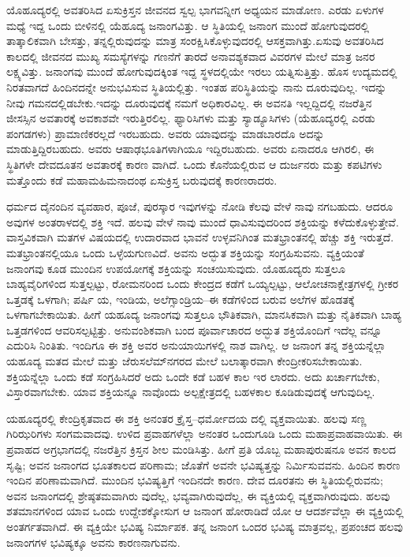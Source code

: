ಯೊಹೂದ್ಯರಲ್ಲಿ ಅವತರಿಸಿದ ಏಸುಕ್ರಿಸ್ತನ ಜೀವನದ ಸ್ವಲ್ಪ ಭಾಗವನ್ನೀಗ ಅಧ್ಯಯನ ಮಾಡೋಣ. ಎರಡು ಏಳುಗಳ ಮಧ್ಯೆ ಇದ್ದ ಒಂದು ಬೀಳಿನಲ್ಲಿ ಯೆಹೂದ್ಯ ಜನಾಂಗವಿತ್ತು. ಆ ಸ್ಥಿತಿಯಲ್ಲಿ ಜನಾಂಗ ಮುಂದೆ ಹೋಗುವುದರಲ್ಲಿ ತಾತ್ಕಾಲಿಕವಾಗಿ ಬೇಸತ್ತು, ತನ್ನಲ್ಲಿರುವುದನ್ನು ಮಾತ್ರ ಸಂರಕ್ಷಿಸಿಕೊಳ್ಳುವುದರಲ್ಲಿ ಆಸಕ್ತವಾಗಿತ್ತು.ಏಸುವು ಅವತರಿಸಿದ ಕಾಲದಲ್ಲಿ ಜೀವನದ ಮುಖ್ಯ ಸಮಸ್ಯೆಗಳನ್ನು ಗಣನೆಗೆ ತಾರದೆ ಅನಾವಶ್ಯಕವಾದ ವಿವರಗಳ ಮೇಲೆ ಮಾತ್ರ ಜನರ ಲಕ್ಷ್ಯವಿತ್ತು. ಜನಾಂಗವು ಮುಂದೆ ಹೋಗುವುದಕ್ಕಿಂತ ಇದ್ದ ಸ್ಥಳದಲ್ಲಿಯೇ ಇರಲು ಯತ್ನಿಸುತ್ತಿತ್ತು. ಹೊಸ ಉದ್ಯಮದಲ್ಲಿ ನಿರತವಾಗದೆ ಹಿಂದಿನದನ್ನೇ ಅನುಭವಿಸುವ ಸ್ಥಿತಿಯಲ್ಲಿತ್ತು. ಇಂತಹ ಪರಿಸ್ಥಿತಿಯನ್ನು ನಾನು ದೂರುವುದಿಲ್ಲ. ಇದನ್ನು ನೀವು ಗಮನದಲ್ಲಿಡಬೇಕು.ಇದನ್ನು ದೂರುವುದಕ್ಕೆ ನಮಗೆ ಅಧಿಕಾರವಿಲ್ಲ. ಈ ಅವನತಿ ಇಲ್ಲದ್ದಿದಲ್ಲಿ ನಜರೆತ್ತಿನ ಜೀಸಸ್ಸಿನ ಅವತಾರಕ್ಕೆ ಅವಕಾಶವೇ ಇರುತ್ತಿರಲಿಲ್ಲ. ಫ್ಯಾರಿಸಿಗಳು ಮತ್ತು ಸ್ಯಾಡ್ಯೂಸಿಗಳು (ಯೆಹೂದ್ಯರಲ್ಲಿ ಎರಡು ಪಂಗಡಗಳು) ಪ್ರಾಮಾಣಿಕರಲ್ಲದೆ ಇರಬಹುದು. ಅವರು ಯಾವುದನ್ನು ಮಾಡಬಾರದೊ ಅದನ್ನು ಮಾಡುತ್ತಿದ್ದಿರಬಹುದು. ಅವರು ಆಷಾಢಭೂತಿಗಳಾಗಿಯೂ ಇದ್ದಿರಬಹುದು. ಅವರು ಏನಾದರೂ ಆಗಿರಲಿ, ಈ ಸ್ಥಿತಿಗಳೇ ದೇವದೂತನ ಅವತಾರಕ್ಕೆ ಕಾರಣ ವಾಗಿದೆ. ಒಂದು ಕೊನೆಯಲ್ಲಿರುವ ಆ ದುರ್ಜನರು ಮತ್ತು ಕಪಟಿಗಳು ಮತ್ತೊಂದು ಕಡೆ ಮಹಾಮಹಿಮನಾದಂಥ ಏಸುಕ್ರಿಸ್ತ ಬರುವುದಕ್ಕೆ ಕಾರಣರಾದರು.

ಧರ್ಮದ ದೈನಂದಿನ ವ್ಯವಹಾರ, ಪೂಜೆ, ಪುರಸ್ಕಾರ ಇವುಗಳನ್ನು ನೋಡಿ ಕೆಲವು ವೇಳೆ ನಾವು ನಗಬಹುದು. ಆದರೂ ಅವುಗಳ ಅಂತರಾಳದಲ್ಲಿ ಶಕ್ತಿ ಇದೆ. ಹಲವು ವೇಳೆ ನಾವು ಮುಂದೆ ಧಾವಿಸುವುದರಿಂದ ಶಕ್ತಿಯನ್ನು ಕಳೆದುಕೊಳ್ಳುತ್ತೇವೆ. ವಾಸ್ತವಿಕವಾಗಿ ಮತಗಳ ವಿಷಯದಲ್ಲಿ ಉದಾರವಾದ ಭಾವನೆ ಉಳ್ಳವನಿಗಿಂತ ಮತಭ್ರಾಂತನಲ್ಲಿ ಹೆಚ್ಚು ಶಕ್ತಿ ಇರುತ್ತದೆ. ಮತಭ್ರಾಂತನಲ್ಲಿಯೂ ಒಂದು ಒಳ್ಳೆಯಗುಣವಿದೆ. ಅವನು ಅದ್ಭುತ ಶಕ್ತಿಯನ್ನು ಸಂಗ್ರಹಿಸುವನು. ವ್ಯಕ್ತಿಯಂತೆ ಜನಾಂಗವು ಕೂಡ ಮುಂದಿನ ಉಪಯೋಗಕ್ಕೆ ಶಕ್ತಿಯನ್ನು ಸಂಚಯಿಸುವುದು. ಯೊಹೂದ್ಯರು ಸುತ್ತಲೂ ಬಾಹ್ಯವೈರಿಗಳಿಂದ ಸುತ್ತಲ್ಪಟ್ಟು, ರೋಮನರಿಂದ ಒಂದು ಕೇಂದ್ರದ ಕಡೆಗೆ ಒಯ್ಯಲ್ಪಟ್ಟು, ಆಲೋಚನಾಕ್ಷೇತ್ರಗಳಲ್ಲಿ ಗ್ರೀಕರ ಒತ್ತಡಕ್ಕೆ ಒಳಗಾಗಿ; ಪರ್ಷಿ ಯ, ಇಂಡಿಯ, ಅಲೆಗ್ಸಾಂಡ್ರಿಯ–ಈ ಕಡೆಗಳಿಂದ ಬರುವ ಅಲೆಗಳ ಹೊಡತಕ್ಕೆ ಒಳಗಾಗಬೇಕಾಯಿತು. ಹೀಗೆ ಯಹೂದ್ಯ ಜನಾಂಗವು ಸುತ್ತಲೂ ಭೌತಿಕವಾಗಿ, ಮಾನಸಿಕವಾಗಿ ಮತ್ತು ನೈತಿಕವಾಗಿ ಬಾಹ್ಯ ಒತ್ತಡಗಳಿಂದ ಆವರಿಸಲ್ಪಟ್ಟಿತ್ತು. ಅನುವಂಶಿಕವಾಗಿ ಬಂದ ಪೂರ್ವಾಚಾರದ ಅದ್ಭುತ ಶಕ್ತಿಯೊಂದಿಗೆ ಇದೆಲ್ಲ ವನ್ನೂ ಎದುರಿಸಿ ನಿಂತಿತು. ಇಂದಿಗೂ ಈ ಶಕ್ತಿ ಅವರ ಅನುಯಾಯಿಗಳಲ್ಲಿ ನಾಶ ವಾಗಿಲ್ಲ. ಆ ಜನಾಂಗ ತನ್ನ ಶಕ್ತಿಯನ್ನೆಲ್ಲಾ ಯಹೂದ್ಯ ಮತದ ಮೇಲೆ ಮತ್ತು ಜೆರುಸಲೆಮ್​ನಗರದ ಮೇಲೆ ಬಲಾತ್ಕಾರವಾಗಿ ಕೇಂದ್ರೀಕರಿಸಬೇಕಾಯಿತು. ಶಕ್ತಿಯನ್ನೆಲ್ಲಾ ಒಂದು ಕಡೆ ಸಂಗ್ರಹಿಸಿದರೆ ಅದು ಒಂದೇ ಕಡೆ ಬಹಳ ಕಾಲ ಇರ ಲಾರದು. ಅದು ಖರ್ಚಾಗಬೇಕು, ವಿಸ್ತಾರವಾಗಬೇಕು. ಯಾವ ಶಕ್ತಿಯನ್ನೂ ನಾವೊಂದು ಅಲ್ಪಕ್ಷೇತ್ರದಲ್ಲಿ ಬಹಳಕಾಲ ಕೂಡಿಡುವುದಕ್ಕೆ ಆಗುವುದಿಲ್ಲ.

ಯಹೂದ್ಯರಲ್ಲಿ ಕೇಂದ್ರಿಕೃತವಾದ ಈ ಶಕ್ತಿ ಅನಂತರ ಕ್ರೈಸ್ತ–ಧರ್ಮೋದಯ ದಲ್ಲಿ ವ್ಯಕ್ತವಾಯಿತು. ಹಲವು ಸಣ್ಣ ಗಿರಿಝರಿಗಳು ಸಂಗಮವಾದವು. ಉಳಿದ ಪ್ರವಾಹಗಳೆಲ್ಲಾ ಅನಂತರ ಒಂದುಗೂಡಿ ಒಂದು ಮಹಾಪ್ರವಾಹವಾಯಿತು. ಈ ಪ್ರವಾಹದ ಅಗ್ರಭಾಗದಲ್ಲಿ ನಜರೆತ್ತಿನ ಕ್ರಿಸ್ತನ ಶೀಲ ಮಂಡಿಸಿತ್ತು. ಹೀಗೆ ಪ್ರತಿ ಯೊಬ್ಬ ಮಹಾಪುರುಷನೂ ಅವನ ಕಾಲದ ಸೃಷ್ಟಿ; ಅವನ ಜನಾಂಗದ ಭೂತಕಾಲದ ಪರಿಣಾಮ; ಜೊತೆಗೆ ಅವನೇ ಭವಿಷ್ಯತ್ತನ್ನು ನಿರ್ಮಿಸುವವನು. ಹಿಂದಿನ ಕಾರಣ ಇಂದಿನ ಪರಿಣಾಮವಾಗಿದೆ. ಮುಂದಿನ ಭವಿಷ್ಯತ್ತಿಗೆ ಇಂದಿನದೇ ಕಾರಣ. ದೇವ ದೂರತನು ಈ ಸ್ಥಿತಿಯಲ್ಲಿರುವನು; ಅವನ ಜನಾಂಗದಲ್ಲಿ ಶ್ರೇಷ್ಠತಮವಾಗಿರು ವುದೆಲ್ಲ, ಭವ್ಯವಾಗಿರುವುದೆಲ್ಲ, ಈ ವ್ಯಕ್ತಿಯಲ್ಲಿ ವ್ಯಕ್ತವಾಗಿರುವುದು. ಹಲವು ಶತಮಾನಗಳಿಂದ ಯಾವ ಒಂದು ಉದ್ದೇಶಕ್ಕೋಸುಗ ಆ ಜನಾಂಗ ಹೋರಾಡಿದೆ ಯೋ ಆ ಆದರ್ಶವೆಲ್ಲಾ ಈ ವ್ಯಕ್ತಿಯಲ್ಲಿ ಅಂತರ್ಗತವಾಗಿದೆ. ಈ ವ್ಯಕ್ತಿಯೇ ಭವಿಷ್ಯ ನಿರ್ಮಾಪಕ. ತನ್ನ ಜನಾಂಗ ಒಂದರ ಭವಿಷ್ಯ ಮಾತ್ರವಲ್ಲ, ಪ್ರಪಂಚದ ಹಲವು ಜನಾಂಗಗಳ ಭವಿಷ್ಯಕ್ಕೂ ಅವನು ಕಾರಣನಾಗುವನು.

